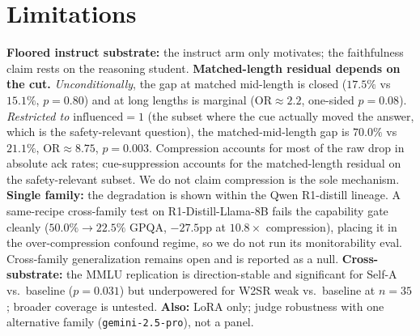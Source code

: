 \documentclass[10pt]{article}
\begin{document}
\section{Limitations}
\label{sec:lim}
\textbf{Floored instruct substrate:} the instruct arm only motivates; the
faithfulness claim rests on the reasoning student. \textbf{Matched-length residual depends on the cut.} \emph{Unconditionally},
the gap at matched mid-length is closed ($17.5\%$ vs $15.1\%$, $p\!=\!0.80$) and
at long lengths is marginal ($\mathrm{OR}\!\approx\!2.2$, one-sided $p\!=\!0.08$).
\emph{Restricted to $\mathrm{influenced}\!=\!1$} (the subset where the cue
actually moved the answer, which is the safety-relevant question), the
matched-mid-length gap is $70.0\%$ vs $21.1\%$, $\mathrm{OR}\!\approx\!8.75$,
$p\!=\!0.003$. Compression accounts for most of the raw drop in absolute ack
rates; cue-suppression accounts for the matched-length residual on the
safety-relevant subset. We do not claim compression is the sole mechanism.
\textbf{Single family:} the degradation is shown within the Qwen R1-distill
lineage. A same-recipe cross-family test on R1-Distill-Llama-8B fails the
capability gate cleanly ($50.0\%\!\to\!22.5\%$ GPQA, $-27.5$pp at $10.8\times$
compression), placing it in the over-compression confound regime, so we do not
run its monitorability eval. Cross-family generalization remains open and is
reported as a null. \textbf{Cross-substrate:} the MMLU replication is
direction-stable and significant for Self-A vs.\ baseline ($p\!=\!0.031$) but
underpowered for W2SR weak vs.\ baseline at $n\!=\!35$; broader coverage is
untested. \textbf{Also:} LoRA only; judge robustness with one alternative family
(\texttt{gemini-2.5-pro}), not a panel.
\end{document}
